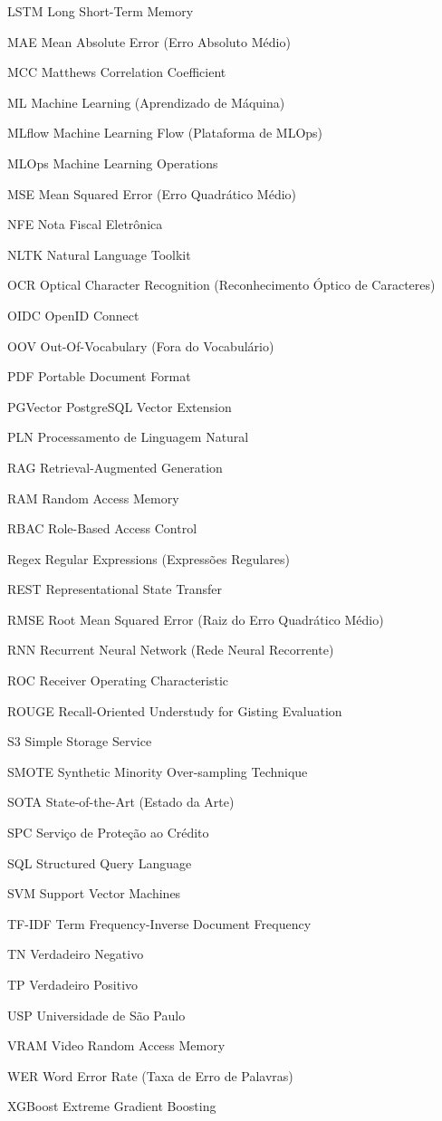 \documentclass[
	12pt,				
	openright,			
	oneside,			
	a4paper,			
	english,			
	brazil				
	]{abntex2}
\begin{document}
\begin{siglas}
	\item[LSTM] Long Short-Term Memory
	\item[MAE] Mean Absolute Error (Erro Absoluto Médio)
	\item[MCC] Matthews Correlation Coefficient
	\item[ML] Machine Learning (Aprendizado de Máquina)
	\item[MLflow] Machine Learning Flow (Plataforma de MLOps)
	\item[MLOps] Machine Learning Operations
	\item[MSE] Mean Squared Error (Erro Quadrático Médio)
	\item[NFE] Nota Fiscal Eletrônica
	\item[NLTK] Natural Language Toolkit
	\item[OCR] Optical Character Recognition (Reconhecimento Óptico de Caracteres)
	\item[OIDC] OpenID Connect
	\item[OOV] Out-Of-Vocabulary (Fora do Vocabulário)
	\item[PDF] Portable Document Format
	\item[PGVector] PostgreSQL Vector Extension
	\item[PLN] Processamento de Linguagem Natural
	\item[RAG] Retrieval-Augmented Generation
	\item[RAM] Random Access Memory
	\item[RBAC] Role-Based Access Control
	\item[Regex] Regular Expressions (Expressões Regulares)
	\item[REST] Representational State Transfer
	\item[RMSE] Root Mean Squared Error (Raiz do Erro Quadrático Médio)
	\item[RNN] Recurrent Neural Network (Rede Neural Recorrente)
	\item[ROC] Receiver Operating Characteristic
	\item[ROUGE] Recall-Oriented Understudy for Gisting Evaluation
	\item[S3] Simple Storage Service
	\item[SMOTE] Synthetic Minority Over-sampling Technique
	\item[SOTA] State-of-the-Art (Estado da Arte)
	\item[SPC] Serviço de Proteção ao Crédito
	\item[SQL] Structured Query Language
	\item[SVM] Support Vector Machines
	\item[TF-IDF] Term Frequency-Inverse Document Frequency
	\item[TN] Verdadeiro Negativo
	\item[TP] Verdadeiro Positivo
	\item[USP] Universidade de São Paulo
	\item[VRAM] Video Random Access Memory
	\item[WER] Word Error Rate (Taxa de Erro de Palavras)
	\item[XGBoost] Extreme Gradient Boosting
\end{siglas}
\cleardoublepage
\end{document}
